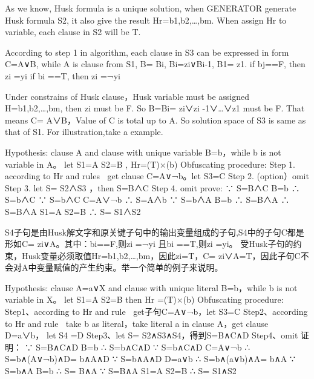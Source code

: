 \documentclass[runningheads,a4paper]{llncs}
\begin{document}
As we know, Husk formula is a unique solution, when GENERATOR generate Husk formula S2, it also give the result Hr={b1,b2,…,bm}. When assign Hr to variable, each clause in S2 will be T.

According to step 1 in algorithm, each clause in S3 can be expressed in form C=A∨B, while A is clause from S1, B= Bi, Bi=zi∨Bi-1, B1= z1.
\newline if bj==F, then zi =yi
\newline if bi ==T, then zi =¬yi

Under constrains of Husk clause，Husk variable must be assigned H={b1,b2,…,bm}, then zi must be F. So B=Bi= zi∨zi -1∨…∨z1 must be F. That means C= A∨B，Value of C is total up to A. So solution space of S3 is same as that of S1. For illustration,take a example.

Hypothesis: clause A and clause with unique variable B=b，while b is not variable in A。
let S1=A S2=B , Hr={(T)×(b) }
Obfuscating procedure:
\newline Step 1. according to Hr and rules ，get clause C=A∨¬b。let S3=C
\newline Step 2. (option）omit
\newline Step 3. let S= S2∧S3 ，then S=B∧C
\newline Step 4. omit
\newline prove:
\newline  ∵ S=B∧C  B=b      ∴ S=b∧C   
\newline  ∵ S=b∧C  C=A∨¬b  ∴ S=A∧b  
\newline  ∵ S=b∧A  B=b      ∴ S=B∧A
\newline  ∴ S=B∧A  S1=A S2=B ∴ S= S1∧S2

S4子句是由Husk解文字和原关键子句中的输出变量组成的子句,S4中的子句C都是形如C= zi∨A。其中：bi==F,则zi =¬yi 且bi ==T,则zi =yi。
\newline 受Husk子句的约束，Husk变量必须取值Hr={b1,b2,…,bm}，因此zi=T，C= zi∨A=T，因此子句C不会对A中变量赋值的产生约束。举一个简单的例子来说明。

Hypothesis: clause A=a∨X and clause with unique literal B=b，while b is not variable in X。
\newline let S1=A S2=B then Hr ={(T)×(b) } 
\newline Obfuscating procedure:
\newline Step1、according to Hr and rule ，get子句C=A∨¬b，let S3=C
\newline Step2、according to Hr and rule ，take b as literal，take literal a in clause A，get clause D=a∨b， let S4 =D
\newline Step3、let S= S2∧S3∧S4，得到S=B∧C∧D
\newline Step4、omit
证明：
∵ S=B∧C∧D  B=b     ∴ S=b∧C∧D
∵ S=b∧C∧D  C=A∨¬b ∴ S=b∧(A∨¬b)∧D= b∧A∧D
∵ S=b∧A∧D  D=a∨b  ∴ S=b∧(a∨b)∧A= b∧A
∵ S=b∧A     B=b      ∴ S= B∧A 
∵ S=B∧A    S1=A  S2=B   ∴ S= S1∧S2
\end{document}
